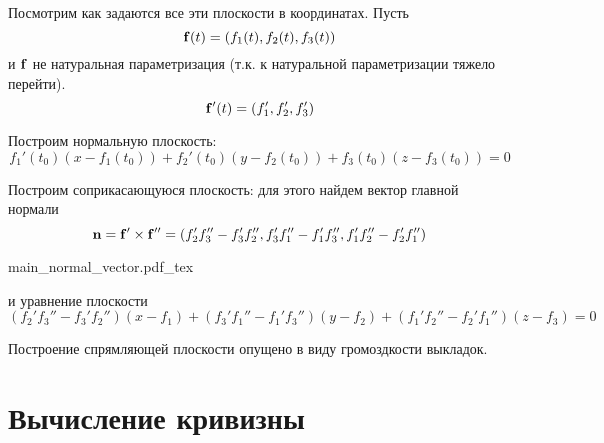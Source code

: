 \documentclass[main]{subfiles}
\begin{document}
Посмотрим как задаются все эти плоскости в координатах.
Пусть
\[\mathbf{f}(t) = (f_1(t), f_2(t), f_3(t))\]
и $\mathbf{f}$ не натуральная параметризация (т.к. к натуральной параметризации тяжело перейти).
\[\mathbf{f}'(t) = (f_1',f_2',f_3')\]

Построим нормальную плоскость:
\[f_1'(t_0)(x - f_1(t_0)) + f_2'(t_0)(y - f_2(t_0)) + f_3(t_0)(z - f_3(t_0)) = 0\]

Построим соприкасающуюся плоскость:
для этого найдем вектор главной нормали
\[\mathbf{n} = \mathbf{f}' \times \mathbf{f}'' = (f_2'f_3'' - f_3'f_2'',f_3'f_1'' - f_1'f_3'', f_1'f_2'' - f_2'f_1'')\]
\begin{center}
    {main_normal_vector.pdf_tex}
\end{center}
и уравнение плоскости
\[(f_2'f_3'' - f_3'f_2'')(x - f_1) + (f_3'f_1'' - f_1'f_3'')(y - f_2) + (f_1'f_2'' - f_2'f_1'')(z - f_3) = 0\]

Построение спрямляющей плоскости опущено в виду громоздкости выкладок.

\section{Вычисление кривизны}
\end{document}
